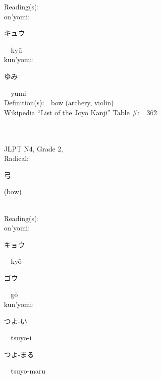 \begin{multicols}{2}
Reading(s):\ \ \\
{\hspace*{1em}}on'yomi:\ \ \\
{\hspace*{2em}}{\begin{CJK}{UTF8}{min} キュウ \end{CJK}}\ \ ky\=u\ \ \\
{\hspace*{1em}}kun'yomi:\ \ \\
{\hspace*{2em}}{\begin{CJK}{UTF8}{min} ゆみ \end{CJK}}\ \ yumi\ \ \\
Definition(s):\ \ bow (archery, violin) \\
Wikipedia ``List of the J\=oy\=o Kanji'' Table \#:\ \ 362 \\
\ \ \\
{\fontsize{34pt}{40pt}  }\ \ \\  %
{JLPT N4, Grade 2, \\Radical:\ \ {\begin{CJK}{UTF8}{min} 弓 \end{CJK}} (bow) } \\
Reading(s):\ \ \\
{\hspace*{1em}}on'yomi:\ \ \\
{\hspace*{2em}}{\begin{CJK}{UTF8}{min} キョウ \end{CJK}}\ \ ky\=o\ \ \\
{\hspace*{2em}}{\begin{CJK}{UTF8}{min} ゴウ \end{CJK}}\ \ g\=o\ \ \\
{\hspace*{1em}}kun'yomi:\ \ \\
{\hspace*{2em}}{\begin{CJK}{UTF8}{min} つよ-い \end{CJK}}\ \ tsuyo-i\ \ \\
{\hspace*{2em}}{\begin{CJK}{UTF8}{min} つよ-まる \end{CJK}}\ \ tsuyo-maru\ \ \\

\end{multicols}
